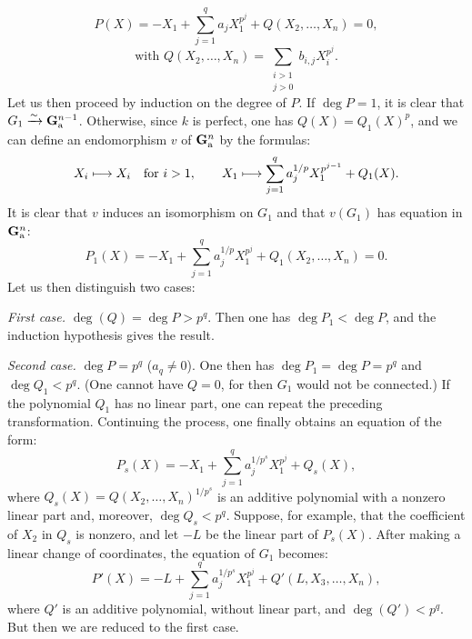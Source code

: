 \begin{equation}\tag{*}
 P(X)=-X_1+\sum_{j=1}^q a_jX_1^{p^j}+Q(X_2,\ldots,X_n)=0,
\end{equation}
\[
 \text{with }Q(X_2,\ldots,X_n)=\sum_{\substack{i>1\\j>0}}b_{i,j}X_i^{p^j}.
\]
Let us then proceed by induction on the degree of $P$. If $\deg P=1$, it is clear that $G_1\xrightarrow{\sim}\mathbf{G}_{\mathrm{a}}^{n-1}$. Otherwise, since $k$ is perfect, one has $Q(X)=Q_1(X)^p$, and we can define an endomorphism $v$ of $\mathbf{G}_{\mathrm{a}}^n$ by the formulas:
\[
 X_i\longmapsto X_i\quad\text{for }i>1,\qquad
 X_1\longmapsto\sum_{j=1}^q a_j^{1/p}X_1^{p^{j-1}}+Q_1(X).
\]
It is clear that $v$ induces an isomorphism on $G_1$ and that $v(G_1)$ has equation in $\mathbf{G}_{\mathrm{a}}^n$:
\begin{equation}\tag*{$(*)_1$}
 P_1(X)=-X_1+\sum_{j=1}^q a_j^{1/p}X_1^{p^j}+Q_1(X_2,\ldots,X_n)=0.
\end{equation}
Let us then distinguish two cases:

\noindent\emph{First case.} $\deg(Q)=\deg P>p^q$. Then one has $\deg P_1<\deg P$, and the induction hypothesis gives the result.

\noindent\emph{Second case.} $\deg P=p^q$ ($a_q\neq0$). One then has $\deg P_1=\deg P=p^q$ and $\deg Q_1<p^q$. (One cannot have $Q=0$, for then $G_1$ would not be connected.) If the polynomial $Q_1$ has no linear part, one can repeat the preceding transformation. Continuing the process, one finally obtains an equation of the form:
\begin{equation}\tag*{$(*)_s$}
 P_s(X)=-X_1+\sum_{j=1}^q a_j^{1/p^s}X_1^{p^j}+Q_s(X),
\end{equation}
where $Q_s(X)=Q(X_2,\ldots,X_n)^{1/p^s}$ is an additive polynomial with a nonzero linear part and, moreover, $\deg Q_s<p^q$. Suppose, for example, that the coefficient of $X_2$ in $Q_s$ is nonzero, and let $-L$ be the linear part of $P_s(X)$. After making a linear change of coordinates, the equation of $G_1$ becomes:
\[
 P'(X)=-L+\sum_{j=1}^q a_j^{1/p^s}X_1^{p^j}+Q'(L,X_3,\ldots,X_n),
\]
where $Q'$ is an additive polynomial, without linear part, and $\deg(Q')<p^q$. But then we are reduced to the first case.

